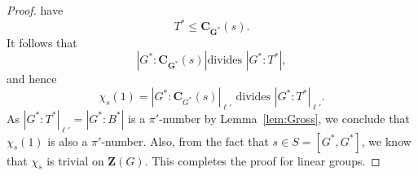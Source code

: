 \documentclass[12pt]{amsart}
\theoremstyle{definition}
\numberwithin{equation}{section}
\newcommand{\bC}{{\mathbf{C}}}
\newcommand{\bG}{{\mathbf{G}}}
\newcommand{\bZ}{{\mathbf{Z}}}
\begin{document}
\begin{proof}
have \[T^*\le
\bC_{\bG^*}(s).\] It follows that \[|G^*:\bC_{\bG^*}(s)| \text{
divides } |G^*:T^*|,\] and hence
\[
\chi_s(1)=|G^*:\bC_{G^*}(s)|_{\ell'} \text{ divides }
|G^*:T^*|_{\ell'}.
\]
As %
$|G^*:T^*|_{\ell'}=|G^*:B^*|$ is a $\pi'$-number %
by
Lemma~\ref{lem:Gross}, we %
conclude that $\chi_s(1)$ is also a
$\pi'$-number. Also, from the fact that $s\in S=[G^*,G^*]$, we know
that $\chi_{s}$ is trivial %
on $\bZ({G})$. %
This completes the proof
for linear %
groups.



\end{proof}
\end{document}

